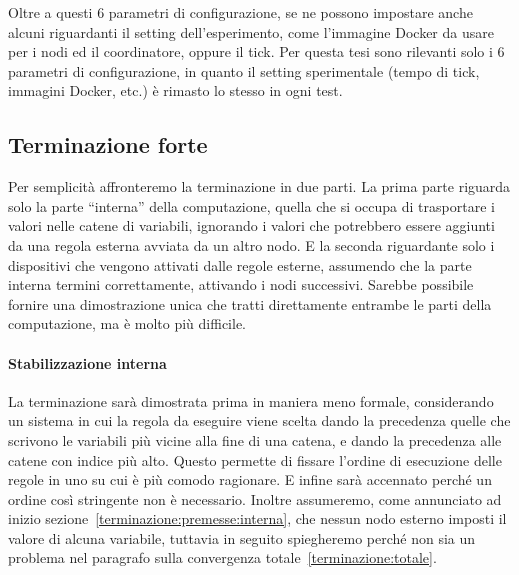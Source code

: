 \documentclass[12pt, a4paper]{article}
\begin{document}
    Oltre a questi 6 parametri di configurazione, se ne possono impostare anche alcuni riguardanti il setting dell'esperimento, come l'immagine Docker da usare per i nodi ed il coordinatore, oppure il tick.
    Per questa tesi sono rilevanti solo i 6 parametri di configurazione, in quanto il setting sperimentale (tempo di tick, immagini Docker, etc.) è rimasto lo stesso in ogni test.

    \subsection{Terminazione forte}

    Per semplicità affronteremo la terminazione in due parti. La prima parte riguarda solo la parte ``interna'' della computazione, quella che si occupa di trasportare i valori nelle catene di variabili, ignorando i valori che potrebbero essere aggiunti da una regola esterna avviata da un altro nodo\label{terminazione:premesse:interna}.
    E la seconda riguardante solo i dispositivi che vengono attivati dalle regole esterne, assumendo che la parte interna termini correttamente, attivando i nodi successivi\label{terminazione:premesse:esterna}.
    Sarebbe possibile fornire una dimostrazione unica che tratti direttamente entrambe le parti della computazione, ma è molto più difficile.

    \paragraph{Stabilizzazione interna}\label{terminazione:interna}

    La terminazione sarà dimostrata prima in maniera meno formale, considerando un sistema in cui la regola da eseguire viene scelta dando la precedenza quelle che scrivono le variabili più vicine alla fine di una catena, e dando la precedenza alle catene con indice più alto. Questo permette di fissare l'ordine di esecuzione delle regole in uno su cui è più comodo ragionare. E infine sarà accennato perché un ordine così stringente non è necessario.
    Inoltre assumeremo, come annunciato ad inizio sezione~\ref{terminazione:premesse:interna}, che nessun nodo esterno imposti il valore di alcuna variabile, tuttavia in seguito spiegheremo perché non sia un problema nel paragrafo sulla convergenza totale~\ref{terminazione:totale}.
\end{document}
